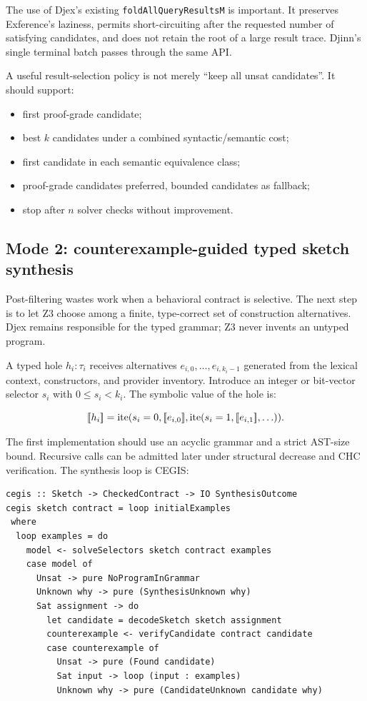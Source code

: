 \documentclass[11pt,oneside]{article}
\providecommand{\llbracket}{\mathopen{[\mkern-3mu[}}
\providecommand{\rrbracket}{\mathclose{]\mkern-3mu]}}
\newcommand{\code}[1]{\texttt{#1}}
\begin{document}
The use of Djex's existing \code{foldAllQueryResultsM} is important. It preserves
Exference's laziness, permits short-circuiting after the requested number of satisfying
candidates, and does not retain the root of a large result trace. Djinn's single
terminal batch passes through the same API.

A useful result-selection policy is not merely ``keep all unsat candidates''. It should
support:

\begin{itemize}
  \item first proof-grade candidate;
  \item best $k$ candidates under a combined syntactic/semantic cost;
  \item first candidate in each semantic equivalence class;
  \item proof-grade candidates preferred, bounded candidates as fallback;
  \item stop after $n$ solver checks without improvement.
\end{itemize}

\subsection{Mode 2: counterexample-guided typed sketch synthesis}

Post-filtering wastes work when a behavioral contract is selective. The next step is
to let Z3 choose among a finite, type-correct set of construction alternatives.
Djex remains responsible for the typed grammar; Z3 never invents an untyped program.

A typed hole $h_i : \tau_i$ receives alternatives
$e_{i,0},\ldots,e_{i,k_i-1}$ generated from the lexical context, constructors, and
provider inventory. Introduce an integer or bit-vector selector $s_i$ with
$0 \leq s_i < k_i$. The symbolic value of the hole is:

\[
  \llbracket h_i \rrbracket =
  \operatorname{ite}(s_i=0,\llbracket e_{i,0}\rrbracket,
    \operatorname{ite}(s_i=1,\llbracket e_{i,1}\rrbracket,\ldots)).
\]

The first implementation should use an acyclic grammar and a strict AST-size bound.
Recursive calls can be admitted later under structural decrease and CHC verification.
The synthesis loop is CEGIS:

\begin{lstlisting}[language=HaskellExt,caption={Typed CEGIS loop}]
cegis :: Sketch -> CheckedContract -> IO SynthesisOutcome
cegis sketch contract = loop initialExamples
 where
  loop examples = do
    model <- solveSelectors sketch contract examples
    case model of
      Unsat -> pure NoProgramInGrammar
      Unknown why -> pure (SynthesisUnknown why)
      Sat assignment -> do
        let candidate = decodeSketch sketch assignment
        counterexample <- verifyCandidate contract candidate
        case counterexample of
          Unsat -> pure (Found candidate)
          Sat input -> loop (input : examples)
          Unknown why -> pure (CandidateUnknown candidate why)
\end{lstlisting}
\end{document}

